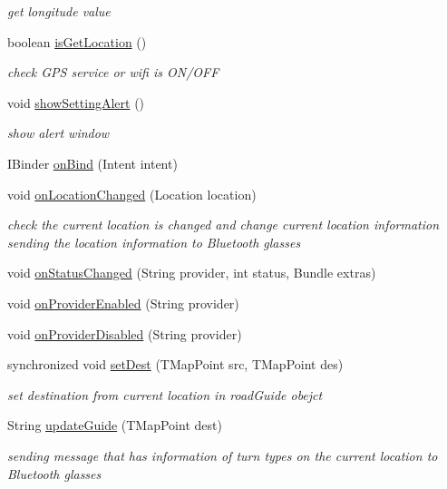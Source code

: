 \begin{DoxyCompactItemize}
\begin{DoxyCompactList}\small\item\em get longitude value \end{DoxyCompactList}\item 
boolean \mbox{\hyperlink{classhi_1_1world_1_1hello_1_1myapplication_1_1_gps_service_acf4aafca162751ba09658d78ce33406f}{is\+Get\+Location}} ()
\begin{DoxyCompactList}\small\item\em check G\+PS service or wifi is O\+N/\+O\+FF \end{DoxyCompactList}\item 
void \mbox{\hyperlink{classhi_1_1world_1_1hello_1_1myapplication_1_1_gps_service_aedb9336a0302461a83e0539ff07fc184}{show\+Setting\+Alert}} ()
\begin{DoxyCompactList}\small\item\em show alert window \end{DoxyCompactList}\item 
I\+Binder \mbox{\hyperlink{classhi_1_1world_1_1hello_1_1myapplication_1_1_gps_service_aa0622dc98d7fb77744a6fddc83599b89}{on\+Bind}} (Intent intent)
\item 
void \mbox{\hyperlink{classhi_1_1world_1_1hello_1_1myapplication_1_1_gps_service_aa9ac2f486abbaa257c0dfce7cc2dd678}{on\+Location\+Changed}} (Location location)
\begin{DoxyCompactList}\small\item\em check the current location is changed and change current location information sending the location information to Bluetooth glasses \end{DoxyCompactList}\item 
void \mbox{\hyperlink{classhi_1_1world_1_1hello_1_1myapplication_1_1_gps_service_a843192b623fde60337b2ab0b253392b7}{on\+Status\+Changed}} (String provider, int status, Bundle extras)
\item 
void \mbox{\hyperlink{classhi_1_1world_1_1hello_1_1myapplication_1_1_gps_service_a7ec743a20f204a0f3ca2efe5545f4246}{on\+Provider\+Enabled}} (String provider)
\item 
void \mbox{\hyperlink{classhi_1_1world_1_1hello_1_1myapplication_1_1_gps_service_a4b324d474cebd1d5d37352db127d29f8}{on\+Provider\+Disabled}} (String provider)
\item 
synchronized void \mbox{\hyperlink{classhi_1_1world_1_1hello_1_1myapplication_1_1_gps_service_aa5f7dabf9f89ea24a34e342c62ff4651}{set\+Dest}} (T\+Map\+Point src, T\+Map\+Point des)
\begin{DoxyCompactList}\small\item\em set destination from current location in road\+Guide obejct \end{DoxyCompactList}\item 
String \mbox{\hyperlink{classhi_1_1world_1_1hello_1_1myapplication_1_1_gps_service_a3cc2d95f81d9af77b15d1532aeea074b}{update\+Guide}} (T\+Map\+Point dest)
\begin{DoxyCompactList}\small\item\em sending message that has information of turn types on the current location to Bluetooth glasses \end{DoxyCompactList}\end{DoxyCompactItemize}
